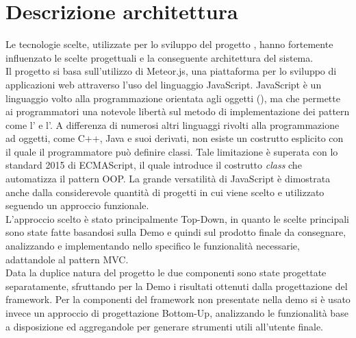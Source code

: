 \section{Descrizione architettura}
Le tecnologie scelte, utilizzate per lo sviluppo del progetto \ProjectName{}, hanno fortemente influenzato le scelte progettuali e la conseguente architettura del sistema.\\

Il progetto si basa sull'utilizzo di Meteor.js, una piattaforma per lo sviluppo di applicazioni web attraverso l'uso del linguaggio JavaScript. JavaScript è un linguaggio volto alla programmazione orientata agli oggetti (), ma che permette ai programmatori una notevole libertà sul metodo di implementazione dei pattern come l' e l'. A differenza di numerosi altri linguaggi rivolti alla programmazione ad oggetti, come C++, Java e suoi derivati, non esiste un costrutto esplicito con il quale il programmatore può definire classi. Tale limitazione è superata con lo standard 2015 di ECMAScript, il quale introduce il costrutto \textit{class} che automatizza il pattern OOP. La grande versatilità di JavaScript è dimostrata anche dalla considerevole quantità di progetti in cui viene scelto e utilizzato seguendo un approccio funzionale.\\

L'approccio scelto è stato principalmente Top-Down, in quanto le scelte principali sono state fatte basandosi sulla Demo e quindi sul prodotto finale da consegnare, analizzando e implementando nello specifico le funzionalità necessarie, adattandole al pattern MVC.\\

Data la duplice natura del progetto le due componenti sono state progettate separatamente, sfruttando per la Demo i risultati ottenuti dalla progettazione del framework. Per la componenti del framework non presentate nella demo si è usato invece un approccio di progettazione Bottom-Up, analizzando le funzionalità base a disposizione ed aggregandole per generare strumenti utili all'utente finale.